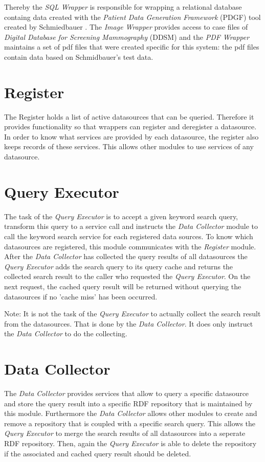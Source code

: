 Thereby the \emph{SQL Wrapper} is responsible for wrapping a relational database containg data created with the \emph{Patient Data Generation Framework} (PDGF) tool created by Schmiedbauer \cite{SchmidbauerBachelorThesis}. The \emph{Image Wrapper} provides access to case files of \emph{Digital Database for Screening Mammography} (DDSM)\cite{DDSM} and the \emph{PDF Wrapper} maintains a set of pdf files that were created specific for this system: the pdf files contain data based on Schmidbauer's test data.

\section{Register}
The Register holds a list of active datasources that can be queried. Therefore it provides functionality so that wrappers can register and deregister a datasource. In order to know what services are provided by each datasource, the register also keeps records of these services. This allows other modules to use services of any datasource.
\section{Query Executor}
The task of the \emph{Query Executor} is to accept a given keyword search query, transform this query to a service call and instructs the \emph{Data Collector} module to call the keyword search service for each registered data sources. To know which datasources are registered, this module communicates with the \emph{Register} module. After the \emph{Data Collector} has collected the query results of all datasources the \emph{Query Executor} adds the search query to its query cache and returns the collected search result to the caller who requested the \emph{Query Executor}. On the next request, the cached query result will be returned without querying the datasources if no 'cache miss' has been occurred.

Note: It is not the task of the \emph{Query Executor} to actually collect the search result from the datasources. That is done by the \emph{Data Collector}. It does only instruct the \emph{Data Collector} to do the collecting.

\section{Data Collector}
The \emph{Data Collector} provides services that allow to query a specific  datasource and store the query result into a specific RDF repository that is maintained by this module. Furthermore the \emph{Data Collector} allows other modules to create and remove a repository that is coupled with a specific search query. This allows the \emph{Query Executor} to merge the search results of all datasources into a seperate RDF repository. Then, again the \emph{Query Executor} is able to delete the repository if the associated and cached query result should be deleted. 

